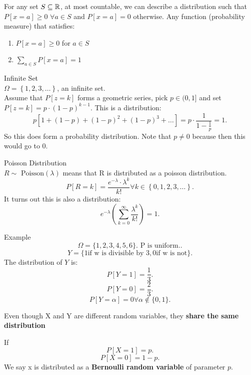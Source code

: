 \documentclass[a4paper]{article}
\begin{document}
\begin{remark}
  For any set $S \subseteq \mathbb{R}$, at most countable, we can describe a distribution such that $P[x = a]\geq 0$ $\forall a \in S$
  and $P[x=a] = 0$ otherwise. Any function (probability measure) that satisfies:
  \begin{enumerate}
    \item $P[x=a] \geq 0$ for $a \in S$
    \item $\sum_{a \in S} P[x=a] = 1$
  \end{enumerate}
\end{remark}

\begin{remark}{Infinite Set} \\
  $\Omega = \left\{ 1,2,3, \ldots \right\}$, an infinite set. \\
  Assume that $P[z=k]$ forms a geometric series, pick $p \in (0,1]$ and set $P[z=k] = p \cdot (1-p)^{k-1}$. This is a distribution:
  \[
    p [1 + (1-p) + (1-p)^{2} + (1-p)^{3} + \ldots ] = p \cdot \frac{1}{1 - \frac{1}{p}} = 1
  .\]
  So this does form a probability distribution. Note that $p \neq 0$ because then this would go to 0. 
\end{remark}

\begin{remark}{Poisson Distribution} \\
  $R \sim \text{ Poisson}(\lambda)$ means that R is distributed as a poisson  distribution. 
   \[
     P[R = k] = \frac{e^{-\lambda} \cdot \lambda^k}{k!}   \forall   k \in \left\{ 0,1,2,3, \ldots \right\} 
  .\] 
  It turns out this is also a distribution:
  \[
  e^{- \lambda} (\sum_{k=0}^\infty \frac{\lambda^k}{k!}) = 1
  .\] 
\end{remark}


\begin{note}{Example}
  \[
    \Omega = \{1,2,3,4,5,6\}. \text{ P is uniform}.
  .\] 
  \[
    Y = \{1 \text{if w is divisible by 3} , 0 \text{if w is not} \} 
  .\] 
  The distribution of $Y$ is: 
  \[
    P[Y=1] = \frac{1}{3}
  .\] 
  \[
    P[Y=0] = \frac{2}{3}
  .\] 
  \[
    P[Y=\alpha] = 0 \forall \alpha \not\in \{0,1\} 
  .\] 
\end{note}

\begin{remark}
  Even though X and Y are different random variables, they \textbf{share the same distribution}
\end{remark}

\begin{definition}
  If \[
    P[X=1] = p
  .\] 
  \[
    P[X=0] = 1 -p
  .\] 
  We say x is distributed as a \textbf{Bernoulli random variable} of parameter $p$.
\end{definition}
\end{document}
